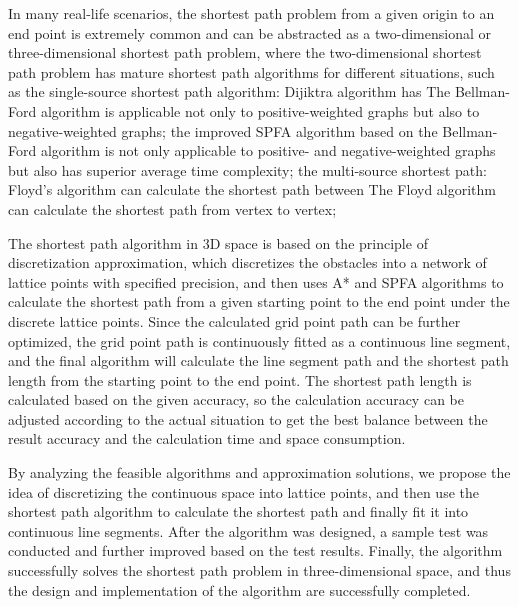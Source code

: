 



\begin{enabstract}
  \par In many real-life scenarios, the shortest path problem from a given origin to an end point is extremely common and can be abstracted as a two-dimensional or three-dimensional shortest path problem, where the two-dimensional shortest path problem has mature shortest path algorithms for different situations, such as the single-source shortest path algorithm: Dijiktra algorithm has The Bellman-Ford algorithm is applicable not only to positive-weighted graphs but also to negative-weighted graphs; the improved SPFA algorithm based on the Bellman-Ford algorithm is not only applicable to positive- and negative-weighted graphs but also has superior average time complexity; the multi-source shortest path: Floyd's algorithm can calculate the shortest path between The Floyd algorithm can calculate the shortest path from vertex to vertex;
  \par The shortest path algorithm in 3D space is based on the principle of discretization approximation, which discretizes the obstacles into a network of lattice points with specified precision, and then uses A* and SPFA algorithms to calculate the shortest path from a given starting point to the end point under the discrete lattice points. Since the calculated grid point path can be further optimized, the grid point path is continuously fitted as a continuous line segment, and the final algorithm will calculate the line segment path and the shortest path length from the starting point to the end point. The shortest path length is calculated based on the given accuracy, so the calculation accuracy can be adjusted according to the actual situation to get the best balance between the result accuracy and the calculation time and space consumption.
  \par By analyzing the feasible algorithms and approximation solutions, we propose the idea of discretizing the continuous space into lattice points, and then use the shortest path algorithm to calculate the shortest path and finally fit it into continuous line segments. After the algorithm was designed, a sample test was conducted and further improved based on the test results. Finally, the algorithm successfully solves the shortest path problem in three-dimensional space, and thus the design and implementation of the algorithm are successfully completed.

\end{enabstract}
\par
\vspace*{2em}

